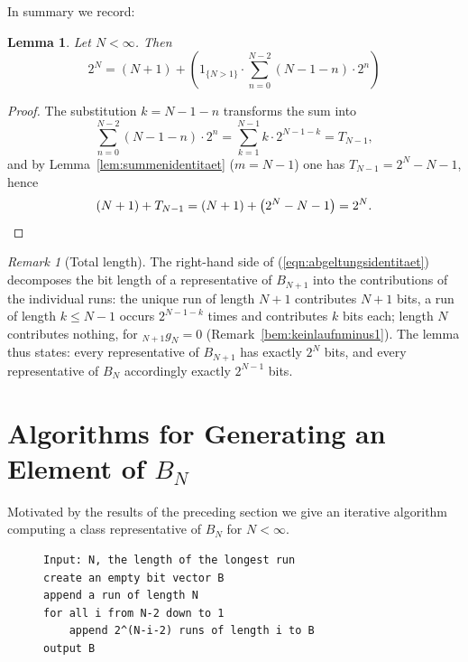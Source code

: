 \documentclass[11pt,a4paper]{scrartcl}
\theoremstyle{plain}
\newtheorem{lemma}[satz]{Lemma}
\theoremstyle{definition}
\theoremstyle{remark}
\newtheorem{bem}[satz]{Remark}
\begin{document}
In summary we record:

\begin{lemma}\label{lem:abgeltungsidentitaet}
Let $N<\infty$. Then
\begin{equation}\label{eqn:abgeltungsidentitaet}
  2^{N} = \left(N+1\right)+\left( 1_{\{N>1\}}\cdot\sum_{n=0}^{N-2} (N-1-n) \cdot 2^n\right)
\end{equation}
\end{lemma}

\begin{proof}
The substitution $k=N-1-n$ transforms the sum into
\begin{equation*}
  \sum_{n=0}^{N-2}\left(N-1-n\right)\cdot 2^{n}
  =\sum_{k=1}^{N-1}k\cdot 2^{N-1-k}=T_{N-1},
\end{equation*}
and by Lemma~\ref{lem:summenidentitaet} ($m=N-1$) one has
$T_{N-1}=2^{N}-N-1$, hence
\begin{equation*}
  \left(N+1\right)+T_{N-1}
  =\left(N+1\right)+\left(2^{N}-N-1\right)=2^{N}.\qedhere
\end{equation*}
\end{proof}

\begin{bem}[Total length]\label{bem:gesamtlaenge}
The right-hand side of (\ref{eqn:abgeltungsidentitaet}) decomposes
the bit length of a representative of $B_{N+1}$ into the
contributions of the individual runs: the unique run of length $N+1$
contributes $N+1$ bits, a run of length $k\leq N-1$ occurs
$2^{N-1-k}$ times and contributes $k$ bits each; length $N$ contributes
nothing, for $_{N+1}g_N=0$
(Remark~\ref{bem:keinlaufnminus1}). The lemma thus states: every
representative of $B_{N+1}$ has exactly $2^{N}$ bits, and every
representative of $B_N$ accordingly exactly $2^{N-1}$ bits.
\end{bem}

\section{Algorithms for Generating an Element of
\texorpdfstring{$B_N$}{B\_N}}\label{sec:algorithmen}

\noindent Motivated by the results of the preceding section we give
an iterative algorithm computing a class representative of $B_N$ for
$N<\infty$.

\begin{figure}[htbp]
\begin{lstlisting}[caption={Iterative generation of a sequence from B\_N for an arbitrary N},label={algo:iterativ}]
Input: N, the length of the longest run
create an empty bit vector B
append a run of length N
for all i from N-2 down to 1
    append 2^(N-i-2) runs of length i to B
output B
\end{lstlisting}
\end{figure}
\end{document}
